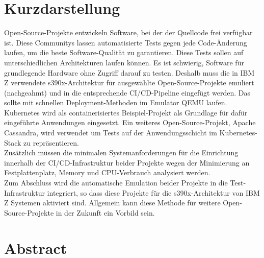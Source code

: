 \thispagestyle{empty}
\section*{Kurzdarstellung}
\label{sec:kurzdarstellung}
Open-Source-Projekte entwickeln Software, bei der der Quellcode frei verfügbar ist. Diese Communitys lassen automatisierte Tests gegen jede Code-Änderung laufen, um die beste Software-Qualität zu garantieren. 
Diese Tests sollen auf unterschiedlichen Architekturen laufen können. Es ist schwierig, Software für grundlegende Hardware ohne Zugriff darauf zu testen. Deshalb muss die in IBM Z verwendete s390x-Architektur für ausgewählte Open-Source-Projekte emuliert (nachgeahmt) und in die entsprechende CI/CD-Pipeline eingefügt werden. 
Das sollte mit schnellen Deployment-Methoden im Emulator QEMU laufen. 
Kubernetes wird als containerisiertes Beispiel-Projekt als Grundlage für dafür eingeführte Anwendungen eingesetzt. Ein weiteres Open-Source-Projekt, Apache Cassandra, wird verwendet um Tests auf der Anwendungsschicht im Kubernetes-Stack zu repräsentieren. \\
Zusätzlich müssen die minimalen Systemanforderungen für die Einrichtung innerhalb der CI/CD-Infrastruktur beider Projekte wegen der Minimierung an Festplattenplatz, Memory und CPU-Verbrauch analysiert werden. \\
Zum Abschluss wird die automatische Emulation beider Projekte in die Test-Infrastruktur integriert, so dass diese Projekte für die s390x-Architektur von IBM Z Systemen aktiviert sind. Allgemein kann diese Methode für weitere Open-Source-Projekte in der Zukunft ein Vorbild sein.



\section*{Abstract}
\label{sec:abstract}

